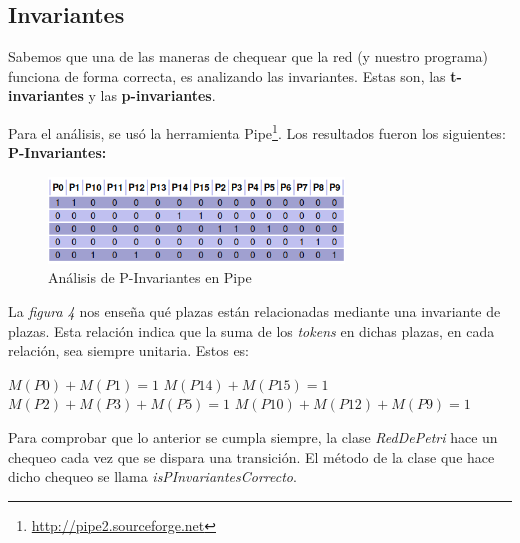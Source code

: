 \documentclass{article}
\newcommand{\fnpipe}{\url{http://pipe2.sourceforge.net}}
\begin{document}
    \subsection{Invariantes}
    Sabemos que una de las maneras de chequear que la red (y nuestro programa) funciona 
    de forma correcta, es analizando las invariantes. Estas son, las \textbf{t-invariantes}
    y las \textbf{p-invariantes}. \par
    Para el análisis, se usó la herramienta Pipe\footnote{\fnpipe}.
    Los resultados fueron los siguientes: \newline \newline
    \textbf{P-Invariantes:} \\
    \begin{figure}[h]
        \includegraphics[width=0.7\textwidth, center]{p-invariante.png}
        \caption{Análisis de P-Invariantes en Pipe}
    \end{figure}
    La \emph{figura 4} nos enseña qué plazas están relacionadas mediante una invariante de
    plazas. Esta relación indica que la suma de los \emph{tokens} en dichas plazas, en cada
    relación, sea siempre unitaria. Estos es: \newline \newline
    \begin{center}
        $M(P0) + M(P1) = 1$ \newline \newline
        $M(P14) + M(P15) = 1$ \newline \newline
        $M(P2) + M(P3) + M(P5) = 1$ \newline \newline
        $M(P10) + M(P12) + M(P9) = 1$ \newline \newline
    \end{center} \par
    Para comprobar que lo anterior se cumpla siempre, la clase \emph{RedDePetri} hace un 
    chequeo cada vez que se dispara una transición. El método de la clase que hace dicho
    chequeo se llama \emph{isPInvariantesCorrecto}. \newline \newline
\end{document}
